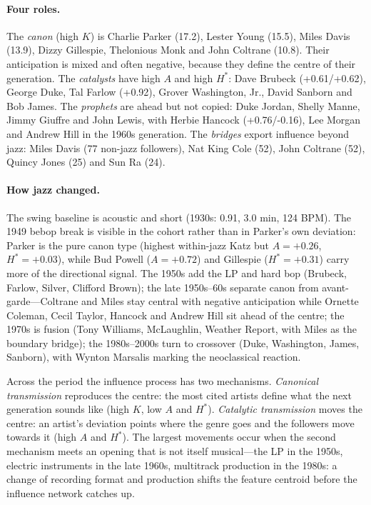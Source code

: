 \paragraph{Four roles.}
The \emph{canon} (high \(K\)) is Charlie Parker (17.2), Lester Young (15.5), Miles
Davis (13.9), Dizzy Gillespie, Thelonious Monk and John Coltrane (10.8). Their
anticipation is mixed and often negative, because they define the centre of their generation. The
\emph{catalysts} have high \(A\) and high \(H^*\): Dave Brubeck (+0.61/+0.62), George
Duke, Tal Farlow (+0.92), Grover Washington, Jr., David Sanborn and Bob James. The
\emph{prophets} are ahead but not copied: Duke Jordan, Shelly Manne, Jimmy Giuffre and John Lewis,
with Herbie Hancock (+0.76/-0.16), Lee Morgan and Andrew Hill in the 1960s
generation. The \emph{bridges} export influence beyond jazz: Miles Davis (77 non-jazz
followers), Nat King Cole (52), John Coltrane (52), Quincy Jones (25)
and Sun Ra (24).

\paragraph{How jazz changed.}
The swing baseline is acoustic and short (1930s: 0.91, 3.0 min, 124
BPM). The 1949 bebop break is visible in the cohort rather than in
Parker's own deviation: Parker is the pure canon type (highest within-jazz
Katz but $A=+0.26$, $H^*=+0.03$), while Bud Powell ($A=+0.72$) and
Gillespie ($H^*=+0.31$) carry more of the directional signal. The 1950s
add the LP and hard bop (Brubeck, Farlow, Silver, Clifford Brown); the
late 1950s--60s separate canon from avant-garde---Coltrane and Miles stay
central with negative anticipation while Ornette Coleman, Cecil Taylor,
Hancock and Andrew Hill sit ahead of the centre; the 1970s is fusion
(Tony Williams, McLaughlin, Weather Report, with Miles as the boundary
bridge); the 1980s--2000s turn to crossover (Duke, Washington, James,
Sanborn), with Wynton Marsalis marking the neoclassical reaction.

Across the period the influence process has two mechanisms. \emph{Canonical transmission}
reproduces the centre: the most cited artists define what the next generation sounds like (high
\(K\), low \(A\) and \(H^*\)). \emph{Catalytic transmission} moves the centre: an artist's
deviation points where the genre goes and the followers move towards it (high \(A\) and
\(H^*\)). The largest movements occur when the second mechanism meets an opening that is not
itself musical---the LP in the 1950s, electric instruments in the late 1960s, multitrack
production in the 1980s: a change of recording format and production shifts the feature
centroid before the influence network catches up.

